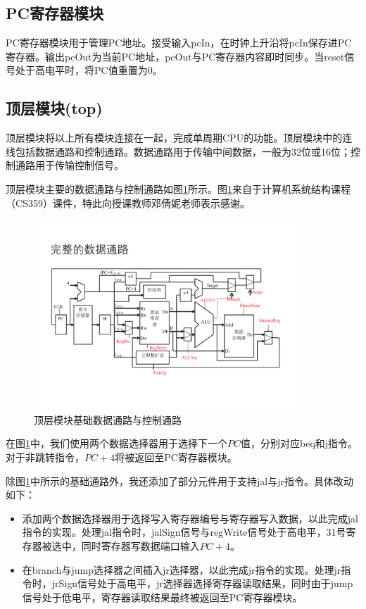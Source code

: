 \documentclass[UTF8]{ctexart}
\begin{document}
\subsection{PC寄存器模块}
    PC寄存器模块用于管理PC地址。接受输入pcIn，在时钟上升沿将pcIn保存进PC寄存器。输出pcOut为当前PC地址，pcOut与PC寄存器内容即时同步。当reset信号处于高电平时，将PC值重置为0。

\subsection{顶层模块(top)}\label{sec:design-top}
    顶层模块将以上所有模块连接在一起，完成单周期CPU的功能。顶层模块中的连线包括数据通路和控制通路。数据通路用于传输中间数据，一般为32位或16位；控制通路用于传输控制信号。\par
    顶层模块主要的数据通路与控制通路如图\ref{fig:top}所示。图\ref{fig:top}来自于计算机系统结构课程（CS359）课件，特此向授课教师邓倩妮老师表示感谢。\par
    \begin{figure}[H]
        \centering
        \includegraphics[width=0.9\textwidth]{fig-top.pdf}
        \caption{顶层模块基础数据通路与控制通路}
        \label{fig:top}
    \end{figure}
    在图\ref{fig:top}中，我们使用两个数据选择器用于选择下一个$PC$值，分别对应beq和j指令。对于非跳转指令，$PC+4$将被返回至PC寄存器模块。\par
    除图\ref{fig:top}中所示的基础通路外，我还添加了部分元件用于支持jal与jr指令。具体改动如下：
    \begin{itemize}
        \item 添加两个数据选择器用于选择写入寄存器编号与寄存器写入数据，以此完成jal指令的实现。处理jal指令时，jalSign信号与regWrite信号处于高电平，31号寄存器被选中，同时寄存器写数据端口输入$PC+4$。
        \item 在branch与jump选择器之间插入jr选择器，以此完成jr指令的实现。处理jr指令时，jrSign信号处于高电平，jr选择器选择寄存器读取结果，同时由于jump信号处于低电平，寄存器读取结果最终被返回至PC寄存器模块。
    \end{itemize}
    
\end{document}
